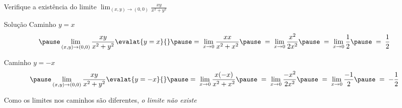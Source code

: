 \begin{question}
  Verifique a existência do limite
  \(
    \lim_{(x,y) \to (0,0)} \frac{xy}{x^2 + y^2}
  \)
\end{question}

\begin{resolution}{Solução}
  Caminho \(y = x\)
  \[
    \pause
    \lim_{(x,y) \to (0,0)} \frac{xy}{x^2 + y^2} \evalat{y=x}{}
    \pause
    =\; \lim_{x \to 0} \frac{x x}{x^2 + x^2}
    \pause
    \;=\; \lim_{x \to 0} \frac{x^2}{2x^2}
    \pause
    \;=\; \lim_{x \to 0} \frac{1}{2}
    \pause
    \;=\; \frac{1}{2}
  \]

  \pause
  Caminho \(y = -x\)
  \[
    \pause
    \lim_{(x,y) \to (0,0)} \frac{xy}{x^2 + y^2} \evalat{y=-x}{}
    \pause
    =\; \lim_{x \to 0} \frac{x(-x)}{x^2 + x^2}
    \pause
    \;=\; \lim_{x \to 0} \frac{-x^2}{2x^2}
    \pause
    \;=\; \lim_{x \to 0} \frac{-1}{2}
    \pause
    \;=\; -\frac{1}{2}
  \]

  \pause
  Como os limites nos caminhos são diferentes,
  \pause
  \emph{o limite não existe}
\end{resolution}

